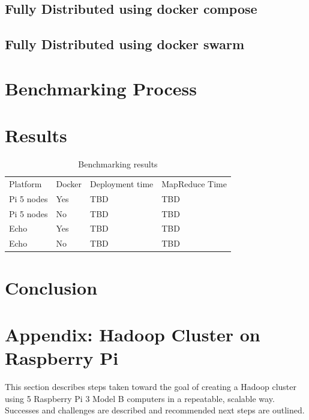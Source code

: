 \subsection{Fully Distributed using docker compose}


\subsection{Fully Distributed using docker swarm}


\section{Benchmarking Process}\label{s:benchrproc}


\section{Results}\label{s:results}

\begin{table}[hbt]
\centering
\caption{Benchmarking results}\label{t:results-table}
\begin{tabular}{llll}
Platform    & Docker & Deployment time & MapReduce Time \\
Pi 5 nodes  & Yes    & TBD             & TBD            \\
Pi 5 nodes  & No     & TBD             & TBD            \\
Echo        & Yes    & TBD             & TBD            \\
Echo        & No     & TBD             & TBD            \\
\end{tabular}
\end{table}



\section{Conclusion}\label{s:conclusion}


\section{Appendix: Hadoop Cluster on Raspberry Pi}\label{s:appendix}
This section describes steps taken toward the goal of creating a
Hadoop cluster using 5 Raspberry Pi 3 Model B computers in a
repeatable, scalable way. Successes and challenges are described and
recommended next steps are outlined.

